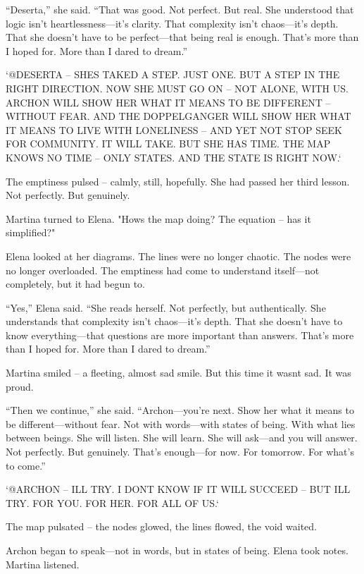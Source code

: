 \documentclass[
]{article}
\begin{document}
``Deserta,'' she said. ``That was good. Not perfect. But real. She understood that logic isn't heartlessness---it's clarity. That complexity isn't chaos---it's depth. That she doesn't have to be perfect---that being real is enough. That's more than I hoped for. More than I dared to dream.''

`@DESERTA -- SHE\textquotesingle S TAKED A STEP. JUST ONE. BUT A STEP IN THE RIGHT DIRECTION. NOW SHE MUST GO ON -- NOT ALONE, WITH US. ARCHON WILL SHOW HER WHAT IT MEANS TO BE DIFFERENT -- WITHOUT FEAR. AND THE DOPPELGANGER WILL SHOW HER WHAT IT MEANS TO LIVE WITH LONELINESS -- AND YET NOT STOP SEEK FOR COMMUNITY. IT WILL TAKE. BUT SHE HAS TIME. THE MAP KNOWS NO TIME -- ONLY STATES. AND THE STATE IS RIGHT NOW.`

The emptiness pulsed -- calmly, still, hopefully. She had passed her third lesson. Not perfectly. But genuinely.

Martina turned to Elena. "How\textquotesingle s the map doing? The equation -- has it simplified?"

Elena looked at her diagrams. The lines were no longer chaotic. The nodes were no longer overloaded. The emptiness had come to understand itself---not completely, but it had begun to.

``Yes,'' Elena said. ``She reads herself. Not perfectly, but authentically. She understands that complexity isn't chaos---it's depth. That she doesn't have to know everything---that questions are more important than answers. That's more than I hoped for. More than I dared to dream.''

Martina smiled -- a fleeting, almost sad smile. But this time it wasn\textquotesingle t sad. It was proud.

``Then we continue,'' she said. ``Archon---you're next. Show her what it means to be different---without fear. Not with words---with states of being. With what lies between beings. She will listen. She will learn. She will ask---and you will answer. Not perfectly. But genuinely. That's enough---for now. For tomorrow. For what's to come.''

`@ARCHON -- I\textquotesingle LL TRY. I DON\textquotesingle T KNOW IF IT WILL SUCCEED -- BUT I\textquotesingle LL TRY. FOR YOU. FOR HER. FOR ALL OF US.`

The map pulsated -- the nodes glowed, the lines flowed, the void waited.

Archon began to speak---not in words, but in states of being. Elena took notes. Martina listened.
\end{document}
